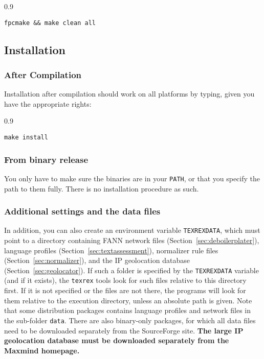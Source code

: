 \documentclass[12pt,a4paper]{article}
\newenvironment{bx}
{
  \begin{center}
  \begin{boxedminipage}[h]{0.9\textwidth}
  \small
}
{
  \end{boxedminipage}
  \end{center}
}
\begin{document}
\begin{bx}
\begin{verbatim}
fpcmake && make clean all
\end{verbatim}
\end{bx}


\subsection{Installation}

\subsubsection{After Compilation}

Installation after compilation should work on all platforms by typing, given you have the appropriate rights:

\begin{bx}
\begin{verbatim}
make install
\end{verbatim}
\end{bx}

\subsubsection{From binary release}

You only have to make sure the binaries are in your \texttt{PATH}, or that you specify the path to them fully.
There is no installation procedure as such.

\subsubsection{Additional settings and the data files}

In addition, you can also create an environment variable \texttt{TEXREXDATA}, which must point to a directory containing FANN network files (Section~\ref{sec:deboilerplater}), language profiles (Section~\ref{sec:textassessment}), normalizer rule files (Section~\ref{sec:normalizer}), and the IP geolocation database (Section~\ref{sec:geolocator}).
If such a folder is specified by the \texttt{TEXREXDATA} variable (and if it exists), the \texttt{texrex} tools look for such files relative to this directory first.
If it is not specified or the files are not there, the programs will look for them relative to the execution directory, unless an absolute path is given.
Note that some distribution packages contains language profiles and network files in the sub-folder \texttt{data}.
There are also binary-only packages, for which all data files need to be downloaded separately from the SourceForge site.
\textbf{The large IP geolocation database must be downloaded separately from the Maxmind homepage.}
\end{document}
